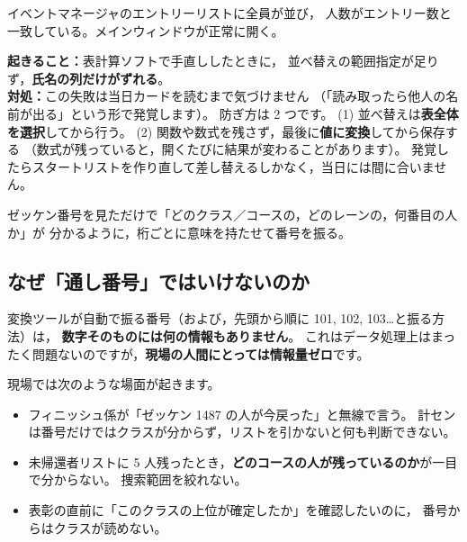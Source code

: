 
\begin{Done}
イベントマネージャのエントリーリストに全員が並び，
人数がエントリー数と一致している。メインウィンドウが正常に開く。
\end{Done}

\begin{Fail}
\textbf{起きること：}表計算ソフトで手直ししたときに，
並べ替えの範囲指定が足りず，\textbf{氏名の列だけがずれる}。\\
\textbf{対処：}この失敗は当日カードを読むまで気づけません
（「読み取ったら他人の名前が出る」という形で発覚します）。
防ぎ方は 2 つです。
(1) 並べ替えは\textbf{表全体を選択}してから行う。
(2) 関数や数式を残さず，最後に\textbf{値に変換}してから保存する
（数式が残っていると，開くたびに結果が変わることがあります）。
発覚したらスタートリストを作り直して差し替えるしかなく，当日には間に合いません。
\end{Fail}


\begin{Goal}
ゼッケン番号を見ただけで「どのクラス／コースの，どのレーンの，何番目の人か」が
分かるように，桁ごとに意味を持たせて番号を振る。
\end{Goal}

\subsection*{なぜ「通し番号」ではいけないのか}

変換ツールが自動で振る番号（および，先頭から順に 101, 102, 103…と振る方法）は，
\textbf{数字そのものには何の情報もありません}。
これはデータ処理上はまったく問題ないのですが，\textbf{現場の人間にとっては情報量ゼロ}です。

現場では次のような場面が起きます。

\begin{itemize}
\item フィニッシュ係が「ゼッケン 1487 の人が今戻った」と無線で言う。
      計センは番号だけではクラスが分からず，リストを引かないと何も判断できない。
\item 未帰還者リストに 5 人残ったとき，\textbf{どのコースの人が残っているのか}が一目で分からない。
      捜索範囲を絞れない。
\item 表彰の直前に「このクラスの上位が確定したか」を確認したいのに，
      番号からはクラスが読めない。
\end{itemize}


